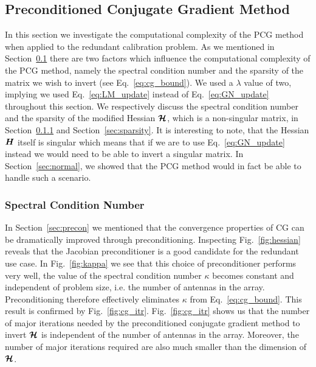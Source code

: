 \documentclass[useAMS,usenatbib]{mn2e}
\newcommand{\bH}{\bmath{H}}
\newcommand{\bmH}{\bmath{\mathcal{H}}}
\begin{document}
\subsection{Preconditioned Conjugate Gradient Method}
\label{sec:pcg}
In this section we investigate the computational complexity of the PCG method when applied to the redundant calibration problem. 
As we mentioned in Section~\ref{sec:pcg} there are two factors which influence the computational complexity of the PCG method, namely the spectral condition number and the sparsity of the matrix we wish to invert (see Eq.~\eqref{eq:cg_bound}). 
We used a $\lambda$ value of two, implying we used Eq.~\eqref{eq:LM_update} instead of Eq.~\eqref{eq:GN_update} throughout this section.
We respectively discuss the spectral condition number and the sparsity of the modified Hessian $\bmH$, which is a non-singular matrix, in Section~\ref{sec:scn} and Section~\ref{sec:sparsity}.
It is interesting to note, that the Hessian $\bH$ itself is singular which means that if we are to use Eq.~\eqref{eq:GN_update} instead we would need to be able to invert a singular matrix. In Section~\ref{sec:normal},
we showed that the PCG method would in fact be able to handle such a scenario.

\subsubsection{Spectral Condition Number}
\label{sec:scn}
In Section~\ref{sec:precon} we mentioned that the convergence properties of CG can be dramatically improved through preconditioning. Inspecting Fig.~\ref{fig:hessian} reveals that the Jacobian preconditioner
is a good candidate for the redundant use case. In Fig.~\ref{fig:kappa} we see that this choice of preconditioner performs very well, the value of the spectral condition number $\kappa$
becomes constant and independent of problem size, i.e. the number of antennas in the array. Preconditioning therefore effectively eliminates $\kappa$ from Eq.~\eqref{eq:cg_bound}. This result
is confirmed by Fig.~\ref{fig:cg_itr}. Fig.~\ref{fig:cg_itr} shows us that the number of major iterations needed by the preconditioned conjugate gradient method to invert $\bmH$ is independent of the number of antennas in the array.
Moreover, the number of major iterations required are also much smaller than the dimension of $\bmH$. 
\end{document}
